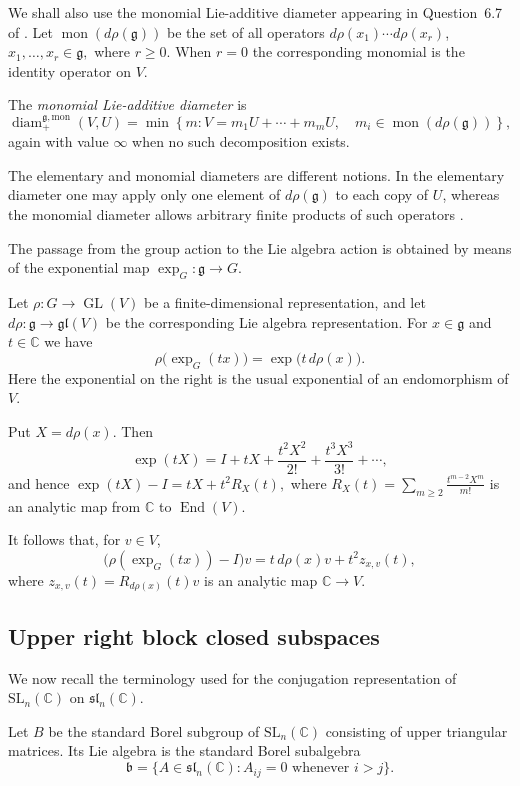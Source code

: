 \documentclass[11pt]{article}
\theoremstyle{remark}
\newcommand{\C}{\mathbb C}
\begin{document}
We shall also use the monomial Lie-additive diameter appearing in
Question~6.7 of \cite{JezernikSpenko}.  Let $\operatorname{mon}(d\rho(\mathfrak g))$
be the set of all operators $d\rho(x_1)\cdots d\rho(x_r)$, $x_1,\ldots,x_r\in\mathfrak g,$
where $r\geq0$.  When $r=0$ the corresponding monomial is the identity
operator on $V$.

The \emph{monomial Lie-additive diameter} is
\[
 \operatorname{diam}^{\mathfrak g,\mathrm{mon}}_{+}(V,U)
 =
 \min\left\{
 m:
 V=m_1U+\cdots+m_mU,
 \quad
 m_i\in\operatorname{mon}(d\rho(\mathfrak g))
 \right\},
\]
again with value $\infty$ when no such decomposition exists.

The elementary and monomial diameters are different notions.  In the
elementary diameter one may apply only one element of $d\rho(\mathfrak g)$
to each copy of $U$, whereas the monomial diameter allows arbitrary finite
products of such operators \cite[Example~6.3]{JezernikSpenko}.

The passage from the group action to the Lie algebra action is obtained by means of the exponential map
$\exp_G:\mathfrak g\longrightarrow G$.

Let $\rho:G\longrightarrow\operatorname{GL}(V)$ be a finite-dimensional representation, and let $d\rho:\mathfrak g\longrightarrow\mathfrak{gl}(V)$ be the corresponding Lie algebra representation. For $x\in\mathfrak g$ and $t\in\C$ we have
\[
 \rho\bigl(\exp_G(tx)\bigr)
 =
 \exp\bigl(t\,d\rho(x)\bigr).
\]
Here the exponential on the right is the usual exponential of an endomorphism of $V$.

Put $X=d\rho(x)$. Then
\[
 \exp(tX)
 =
 I+tX+\frac{t^2X^2}{2!}+\frac{t^3X^3}{3!}+\cdots,
\]
and hence $\exp(tX)-I=tX+t^2R_X(t),$ where
$R_X(t)=\sum_{m\geq2}\frac{t^{m-2}X^m}{m!}$ is an analytic map from $\C$ to $\operatorname{End}(V)$.

It follows that, for $v\in V$,
$$\bigl(\rho(\exp_G(tx))-I\bigr)v
 =
 t\,d\rho(x)v+t^2z_{x,v}(t),$$
where $z_{x,v}(t)=R_{d\rho(x)}(t)v$ is an analytic map $\C\to V$.


\subsection{Upper right block closed subspaces}

We now recall the terminology used for the conjugation representation of
$\mathrm{SL}_n(\C)$ on $\mathfrak{sl}_n(\C)$.

Let $B$ be the standard Borel subgroup of $\mathrm{SL}_n(\C)$ consisting
of upper triangular matrices.  Its Lie algebra is the standard Borel
subalgebra
\[
 \mathfrak b
 =
 \{A\in\mathfrak{sl}_n(\C):
 A_{ij}=0\text{ whenever }i>j\}.
\]
\end{document}
